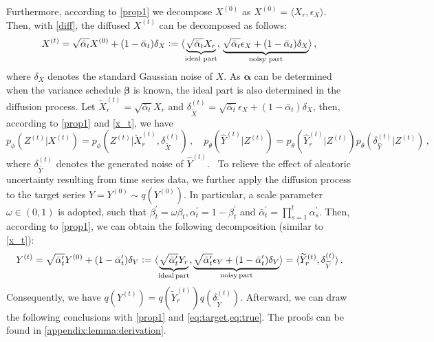 Furthermore, according to \cref{prop1} we decompose $X^{(0)}$ as $X^{(0)} = \langle X_r, \epsilon_X \rangle$.~%
Then, with \cref{diff}, the diffused $X^{(t)}$ can be decomposed as follows: 
\begin{equation}    \label{x_t}
    X^{(t)} = \sqrt{\bar{\alpha}_t}X^{(0)} + (1-\bar{\alpha}_t)\delta_X 
    \vcentcolon = 
    \langle 
    \underbrace{\sqrt{\bar{\alpha}_t}X_r}_{\text{ideal}\,\, \text{part}}, \,
    \underbrace{\sqrt{\bar{\alpha}_t}\epsilon_X + (1-\bar{\alpha}_t)\delta_{X}}_{\text{noisy} \,\, \text{part}}
    \rangle 
    \, ,
\end{equation}
where $\delta_X$ denotes the standard Gaussian noise of $X$. 
As $\bm{\alpha}$ can be determined when the variance schedule $\bm{\beta}$ is known, the ideal part is also determined in the diffusion process. 
Let $\widetilde{X}_r^{(t)} = \sqrt{\bar{\alpha}_t}X_r$ and ${\delta}_{\widetilde{X}}^{(t)} = \sqrt{\bar{\alpha}_t} \epsilon_X + (1-\bar{\alpha}_t) \delta_X $,  
then, according to \cref{prop1} and \cref{x_t}, we have   
\begin{equation}    \label{eq:target}
    p_\phi (Z^{(t)} | X^{(t)}) = p_\phi (Z^{(t)}|\widetilde{X}_r^{(t)}, {\delta}_{\widetilde{X}}^{(t)}) 
\, , \quad 
    p_\theta (\widehat{Y}^{(t)}|Z^{(t)}) = p_\theta (\widehat{Y}_r^{(t)} | Z^{(t)})  p_\theta ({\delta}_{\widehat{Y}}^{(t)} | Z^{(t)})
    \, ,
\end{equation}
where $ \delta_{\widehat{Y}}^{(t)} $ denotes the generated noise of $\widehat{Y}^{(t)}$.~%
To relieve the effect of aleatoric uncertainty resulting from time series data, we further apply the  diffusion process to the target series $Y = Y^{(0)} \sim q(Y^{(0)})$. 
In particular, 
a scale parameter $\omega \in (0, 1)$ is adopted, such that 
$ {\beta}_t^{\prime} = \omega \beta_t, \alpha_t^{\prime} = 1 - {\beta}_t^{\prime}$ 
and 
$ \bar{\alpha}^{\prime}_{t} =  \prod_{s=1}^{t} \alpha_s^{\prime}$. 
Then, according to \cref{prop1}, we can obtain the following decomposition (similar to \cref{x_t}):
\begin{equation}    \label{eq:true}
    Y^{(t)} = \sqrt{\bar{\alpha}^{\prime}_t} Y^{(0)} + (1-\bar{\alpha}^{\prime}_t) \delta_Y 
    \vcentcolon = 
    \langle 
    \underbrace{\sqrt{\bar{\alpha}^{\prime}_t}Y_r}_{\text{ideal} \, \text{part}},
    \underbrace{\sqrt{\bar{\alpha}^{\prime}_t}\epsilon_{Y} + (1-\bar{\alpha}^{\prime}_t)\delta_Y}_{\text{noisy} \, \text{part}} 
    \rangle 
    = \langle \widetilde{Y}_r^{(t)}, {\delta}_{\widetilde{Y}}^{(t)} \rangle \, . 
\end{equation}
Consequently, we have 
$  q(Y^{(t)})  =  q(\widetilde{Y}_r^{(t)})  q({\delta}_{\widetilde{Y}}^{(t)}) $.
Afterward, we can draw the following conclusions with \cref{prop1} and \cref{eq:target,eq:true}. 
The proofs can be found in \cref{appendix:lemma:derivation}. 

